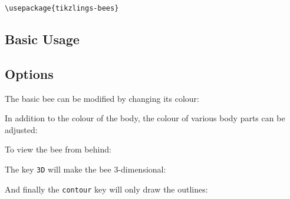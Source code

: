 \documentclass[parskip=half]{scrartcl}
\begin{document}
\begin{tcolorbox}[lower separated=false, lefthand width=.8\linewidth]
\vspace*{0.5cm}
\lstinline|\usepackage{tikzlings-bees}| 
\vspace*{0.5cm}
\end{tcolorbox}

\subsection{Basic Usage}

\begin{tcblisting}{}
\bee
\end{tcblisting}

\subsection{Options}

The basic bee can be modified by changing its colour:
\begin{tcblisting}{}
\bee[body=blue]
\end{tcblisting}

In addition to the colour of the body, the colour of various body parts can be adjusted:
\begin{tcblisting}{}
\bee[antennas=red]
\end{tcblisting}
\begin{tcblisting}{}
\bee[eye=red]
\end{tcblisting}
\begin{tcblisting}{}
\bee[mouth=red]
\end{tcblisting}
\begin{tcblisting}{}
\bee[wings=red]
\end{tcblisting}
\begin{tcblisting}{}
\bee[hands=red]
\end{tcblisting}
\begin{tcblisting}{}
\bee[stripes=red]
\end{tcblisting}

To view the bee from behind:
\begin{tcblisting}{}
\bee[back]
\end{tcblisting}

The key \lstinline|3D| will make the bee 3-dimensional:
\begin{tcblisting}{}
\bee[3D]
\end{tcblisting}

And finally the \lstinline|contour| key will only draw the outlines:
\begin{tcblisting}{}
\bee[contour=black]
\end{tcblisting}
\end{document}
